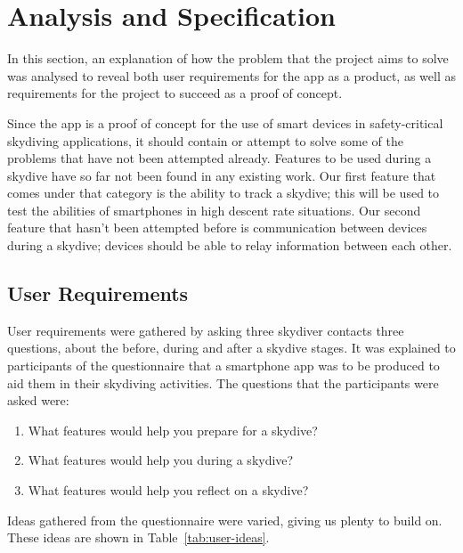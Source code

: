 \section{Analysis and Specification}\label{sec:analysis-and-spec}
In this section, an explanation of how the problem that the project aims to solve was analysed to reveal both user requirements for the app as a product, as well as requirements for the project to succeed as a proof of concept.

Since the app is a proof of concept for the use of smart devices in safety-critical skydiving applications, it should contain or attempt to solve some of the problems that have not been attempted already. Features to be used during a skydive have so far not been found in any existing work. Our first feature that comes under that category is the ability to track a skydive; this will be used to test the abilities of smartphones in high descent rate situations. Our second feature that hasn't been attempted before is communication between devices during a skydive; devices should be able to relay information between each other.

\subsection{User Requirements}
User requirements were gathered by asking three skydiver contacts three questions, about the before, during and after a skydive stages. It was explained to participants of the questionnaire that a smartphone app was to be produced to aid them in their skydiving activities. The questions that the participants were asked were:
\begin{enumerate}
  \item{What features would help you prepare for a skydive?}
  \item{What features would help you during a skydive?}
  \item{What features would help you reflect on a skydive?}
\end{enumerate}

Ideas gathered from the questionnaire were varied, giving us plenty to build on. These ideas are shown in Table~\vref{tab:user-ideas}.

